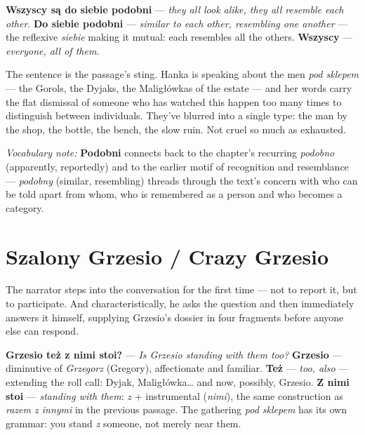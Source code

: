 \textbf{Wszyscy są do siebie podobni} --- \textit{they all look
alike, they all resemble each other}. \textbf{Do siebie podobni}
--- \textit{similar to each other, resembling one another} ---
the reflexive \textit{siebie} making it mutual: each resembles
all the others. \textbf{Wszyscy} --- \textit{everyone, all of
them}.

\medskip
The sentence is the passage's sting. Hanka is speaking about
the men \textit{pod sklepem} --- the Gorols, the Dyjaks, the
Maligłówkas of the estate --- and her words carry the flat
dismissal of someone who has watched this happen too many times
to distinguish between individuals. They've blurred into a
single type: the man by the shop, the bottle, the bench, the
slow ruin. Not cruel so much as exhausted.

\medskip
\noindent\textit{Vocabulary note:} \textbf{Podobni} connects
back to the chapter's recurring \textit{podobno} (apparently,
reportedly) and to the earlier motif of recognition and
resemblance --- \textit{podobny} (similar, resembling) threads
through the text's concern with who can be told apart from whom,
who is remembered as a person and who becomes a category.

\section{Szalony Grzesio / Crazy Grzesio}



The narrator steps into the conversation for the first time ---
not to report it, but to participate. And characteristically,
he asks the question and then immediately answers it himself,
supplying Grzesio's dossier in four fragments before anyone
else can respond.

\textbf{Grzesio też z nimi stoi?} --- \textit{Is Grzesio
standing with them too?} \textbf{Grzesio} --- diminutive of
\textit{Grzegorz} (Gregory), affectionate and familiar.
\textbf{Też} --- \textit{too, also} --- extending the roll
call: Dyjak, Maligłówka\ldots{} and now, possibly, Grzesio.
\textbf{Z nimi stoi} --- \textit{standing with them}: \textit{z}
+ instrumental (\textit{nimi}), the same construction as
\textit{razem z innymi} in the previous passage. The gathering
\textit{pod sklepem} has its own grammar: you stand \textit{z}
someone, not merely near them.

